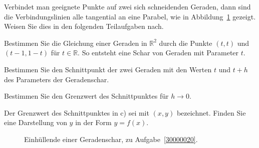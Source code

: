 Verbindet man geeignete Punkte auf zwei sich schneidenden Geraden,
dann sind die Verbindungslinien alle tangential an eine Parabel,
wie in Abbildung~\ref{30000020:figure} gezeigt.
Weisen Sie dies in den folgenden Teilaufgaben nach.
\begin{teilaufgaben}
\item
Bestimmen Sie die Gleichung einer Geraden in $\mathbb R^2$ durch die Punkte
$(t,t)$ und $(t-1,1-t)$ für $t\in\mathbb R$.
So entsteht eine Schar von Geraden mit Parameter $t$.
\item
Bestimmen Sie den Schnittpunkt der zwei Geraden mit den Werten
$t$ und $t+h$ des Parameters der Geradenschar.
\item
Bestimmen Sie den Grenzwert des Schnittpunktes für $h\to 0$.
\item
Der Grenzwert des Schnittpunktes in c) sei mit $(x,y)$ bezeichnet.
Finden Sie eine Darstellung von $y$ in der Form $y=f(x)$.
\end{teilaufgaben}

\begin{figure}[ht]
\centering
{}
\caption{Einhüllende einer Geradenschar, zu Aufgabe~\ref{30000020}.
\label{30000020:figure}}
\end{figure}

